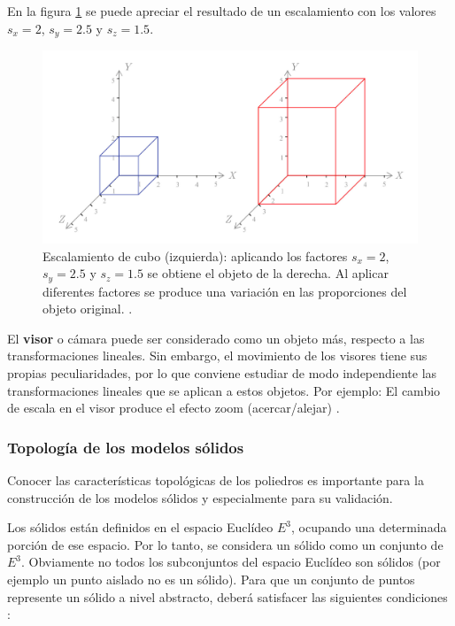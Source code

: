 En la figura \ref{fig:escala} se puede apreciar el resultado de un escalamiento con los valores $s_x=2$, $s_y=2.5$ y $s_z=1.5$.

\begin{center}
\begin{figure}[ht]
\includegraphics[width=12cm]{Img/GEO/geo-escala0.jpg}
\centering
\caption{\footnotesize{Escalamiento de cubo (izquierda):  aplicando los factores $s_x=2$, $s_y=2.5$ y $s_z=1.5$ se obtiene el objeto de la derecha. Al aplicar diferentes factores se produce una variación en las proporciones del objeto original. \citep{Matias2007}.}}
\label{fig:escala}
\end{figure}
\end{center}


El \textbf{visor} o cámara puede ser considerado como un objeto más, respecto a las transformaciones lineales. Sin embargo, el movimiento de los visores tiene sus propias peculiaridades, por lo que conviene estudiar de modo independiente las transformaciones lineales que se aplican a estos objetos. Por ejemplo: El cambio de escala en el visor produce el efecto zoom (acercar/alejar) \citep{Ramos2011}.

\subsubsection{Topología de los modelos sólidos}
\newline
Conocer las características topológicas de los poliedros es importante para la construcción de los modelos sólidos y especialmente para su validación. 

Los sólidos están definidos en el espacio Euclídeo $E^3$, ocupando una determinada porción de ese espacio. Por lo tanto, se considera un sólido como un conjunto de $E^3$. Obviamente no todos los subconjuntos del espacio Euclídeo son sólidos (por ejemplo un punto aislado no es un sólido). Para que un conjunto de puntos represente un sólido a nivel abstracto,  deberá satisfacer las siguientes condiciones \citep{Torres2014}:

